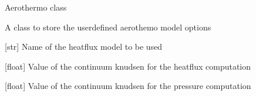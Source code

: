\documentclass[letterpaper,10pt,english]{sphinxmanual}
\begin{document}
\begin{fulllineitems}
\label{\detokenize{modules:configuration.Aerothermo}}
\pysigstartsignatures
{}
\pysigstopsignatures
\sphinxAtStartPar
Aerothermo class

\sphinxAtStartPar
A class to store the user\sphinxhyphen{}defined aerothemo model options

\begin{fulllineitems}
\label{\detokenize{modules:configuration.Aerothermo.heat_model}}
\pysigstartsignatures
{}
\pysigstopsignatures
\sphinxAtStartPar
{[}str{]} Name of the heatflux model to be used

\end{fulllineitems}


\begin{fulllineitems}
\label{\detokenize{modules:configuration.Aerothermo.knc_heatflux}}
\pysigstartsignatures
{}
\pysigstopsignatures
\sphinxAtStartPar
{[}float{]} Value of the continuum knudsen for the heatflux computation

\end{fulllineitems}


\begin{fulllineitems}
\label{\detokenize{modules:configuration.Aerothermo.knc_pressure}}
\pysigstartsignatures
{}
\pysigstopsignatures
\sphinxAtStartPar
{[}float{]} Value of the continuum knudsen for the pressure computation


\end{fulllineitems}
\end{fulllineitems}
\end{document}
